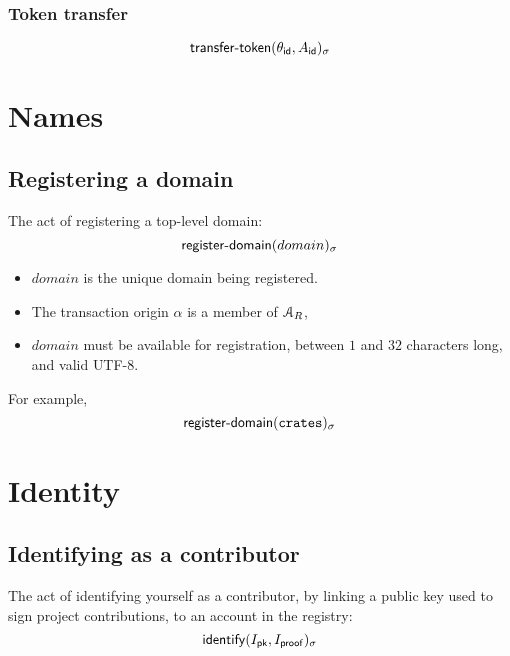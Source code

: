 \subsubsection{Token transfer}
\[
    \operatorname{\mathsf{transfer-token}}\lparen\theta_{\mathsf{id}}, A_{\mathsf{id}}\rparen_\sigma
\]

\section{Names}

\subsection{Registering a domain}
The act of registering a top-level domain:
\[
    \operatorname{\mathsf{register-domain}}\lparen domain\rparen_\sigma
\]
\begin{itemize}
    \item $domain$ is the unique domain being registered.
\end{itemize}
\validation
\begin{itemize}
    \item The transaction origin $\alpha$ is a member of $\mathcal{A}_R$,
    \item $domain$ must be available for registration, between $1$ and $32$
        characters long, and valid \textsf{UTF-8}.
\end{itemize}
For example,
\[
    \operatorname{\mathsf{register-domain}}\lparen\mathtt{crates}\rparen_\sigma
\]

\section{Identity}

\subsection{Identifying as a contributor}
The act of identifying yourself as a contributor, by linking a public key used
to sign project contributions, to an account in the registry:
\[
    \operatorname{\mathsf{identify}}\lparen I_{\mathsf{pk}}, I_{\mathsf{proof}}\rparen_\sigma
\]

